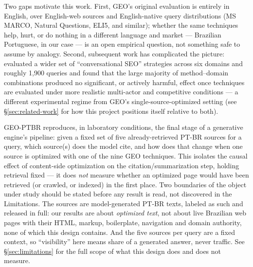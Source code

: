 \documentclass[11pt,a4paper]{article}
\begin{document}
Two gaps motivate this work. First, GEO's original evaluation is entirely
in English, over English-web sources and English-native query
distributions (MS MARCO, Natural Questions, ELI5, and similar); whether the
same techniques help, hurt, or do nothing in a different language and
market --- Brazilian Portuguese, in our case --- is an open empirical question,
not something safe to assume by analogy. Second, subsequent work has
complicated the picture: \citet{puerto2025cseo} evaluated a wider set of
``conversational SEO'' strategies across six domains and roughly 1{,}900
queries and found that the large majority of method--domain combinations
produced no significant, or actively harmful, effect once techniques are
evaluated under more realistic multi-actor and competitive conditions --- a
different experimental regime from GEO's single-source-optimized setting
(see \S\ref{sec:related-work} for how this project positions itself
relative to both).

GEO-PTBR reproduces, in laboratory conditions, the final stage of a
generative engine's pipeline: given a fixed set of five already-retrieved
PT-BR sources for a query, which source(s) does the model cite, and how
does that change when one source is optimized with one of the nine GEO
techniques. This isolates the causal effect of content-side optimization on
the citation/summarization step, holding retrieval fixed --- it does
\emph{not} measure whether an optimized page would have been retrieved (or
crawled, or indexed) in the first place. Two boundaries of the object under
study should be stated before any result is read, not discovered in the
Limitations. The sources are model-generated PT-BR texts, labeled as such
and released in full: our results are about \emph{optimized text}, not about
live Brazilian web pages with their HTML, markup, boilerplate, navigation
and domain authority, none of which this design contains. And the five
sources per query are a fixed context, so ``visibility'' here means share of
a generated answer, never traffic. See \S\ref{sec:limitations} for the full
scope of what this design does and does not measure.
\end{document}

